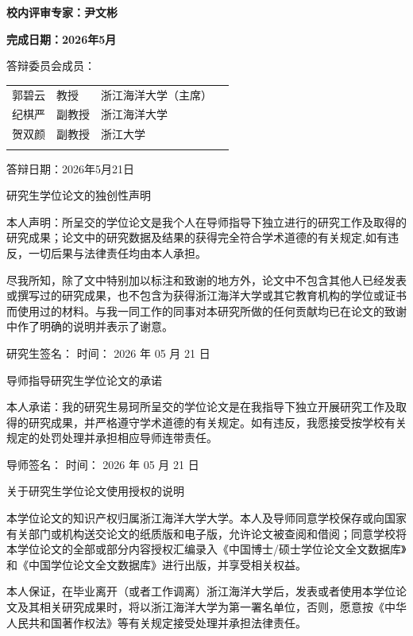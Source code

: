 \documentclass[
  12pt,
]{article}
\newcounter{none} %
\begin{document}
\textbf{校内评审专家：尹文彬}

\textbf{完成日期：2026年5月}

答辩委员会成员：

{\def\LTcaptype{none} %
\begin{longtable}[]{@{}
  >{\raggedright\arraybackslash}p{}
  >{\raggedright\arraybackslash}p{}
  >{\raggedright\arraybackslash}p{}
  >{\raggedright\arraybackslash}p{}@{}}
\toprule\noalign{}
\endhead
\bottomrule\noalign{}
\endlastfoot
郭碧云 & 教授 & 浙江海洋大学（主席） & \\
纪棋严 & 副教授 & 浙江海洋大学 & \\
贺双颜 & 副教授 & 浙江大学 & \\
& & & \\
\end{longtable}
}

答辩日期：2026年5月21日

研究生学位论文的独创性声明

本人声明：所呈交的学位论文是我个人在导师指导下独立进行的研究工作及取得的研究成果；论文中的研究数据及结果的获得完全符合学术道德的有关规定,如有违反，一切后果与法律责任均由本人承担。

尽我所知，除了文中特别加以标注和致谢的地方外，论文中不包含其他人已经发表或撰写过的研究成果，也不包含为获得浙江海洋大学或其它教育机构的学位或证书而使用过的材料。与我一同工作的同事对本研究所做的任何贡献均已在论文的致谢中作了明确的说明并表示了谢意。

研究生签名： 时间： 2026 年 05 月 21 日

导师指导研究生学位论文的承诺

本人承诺：我的研究生易珂所呈交的学位论文是在我指导下独立开展研究工作及取得的研究成果，并严格遵守学术道德的有关规定。如有违反，我愿接受按学校有关规定的处罚处理并承担相应导师连带责任。

导师签名： 时间： 2026 年 05 月 21 日

关于研究生学位论文使用授权的说明

本学位论文的知识产权归属浙江海洋大学大学。本人及导师同意学校保存或向国家有关部门或机构送交论文的纸质版和电子版，允许论文被查阅和借阅；同意学校将本学位论文的全部或部分内容授权汇编录入《中国博士/硕士学位论文全文数据库》和《中国学位论文全文数据库》进行出版，并享受相关权益。

本人保证，在毕业离开（或者工作调离）浙江海洋大学后，发表或者使用本学位论文及其相关研究成果时，将以浙江海洋大学为第一署名单位，否则，愿意按《中华人民共和国著作权法》等有关规定接受处理并承担法律责任。
\end{document}
